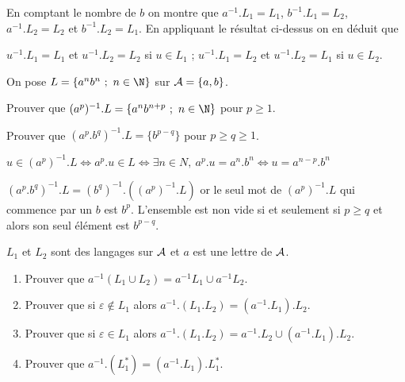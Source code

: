 \begin{Answer}
En comptant le nombre de $b$ on montre que 
$a^{-1}.L_1 = L_1$, $b^{-1}.L_1 = L_2$, $a^{-1}.L_2 = L_2$ et $b^{-1}.L_2 = L_1$.
En appliquant le résultat ci-dessus on en déduit que

$u^{-1}.L_1 = L_1$ et $u^{-1}.L_2 = L_2$ si $u\in L_1$ ; 
$u^{-1}.L_1 = L_2$ et $u^{-1}.L_2 = L_1$ si $u\in L_2$.
\end{Answer}
\begin{Exercise}[title = Un autre exemple]

On pose $L=\{a^nb^n\ ;\ n\in\N\}$ sur ${\cal A}=\{a,b\}$.

Prouver que $(a^p)^{-1}.L= \{a^nb^{n+p}\ ;\ n\in\N\}$ pour $p\ge 1$.

Prouver que $(a^p.b^q)^{-1}.L= \{b^{p-q}\}$ pour $p\ge q\ge 1$.
\end{Exercise}
\begin{Answer}

$ u\in (a^p)^{-1}.L \iff a^p.u \in L \iff \exists n\in N,\ a^p.u=a^n.b^n \iff u = a^{n-p}.b^n$

$(a^p.b^q)^{-1}.L = (b^q)^{-1}.\left((a^p)^{-1}.L\right)$ or le seul mot de $(a^p)^{-1}.L$ qui commence par un $b$ est $b^p$. L'ensemble est non vide si et seulement si $p\ge q$ et alors son seul élément est $b^{p-q}$.
\end{Answer}
\begin{Exercise}[title = Opérations rationnelles]

$L_1$ et $L_2$ sont des langages sur ${\cal A}$ et $a$ est une lettre de ${\cal A}$.

\begin{enumerate}
\item Prouver que $a^{-1}(L_1\cup L_2) = a^{-1}L_1 \cup a^{-1}L_2$.
 
\item Prouver que si $\varepsilon \notin L_1$ alors $a^{-1}.(L_1.L_2)= (a^{-1}.L_1).L_2$.

\item Prouver que si $\varepsilon \in L_1$ alors $a^{-1}.(L_1.L_2) = a^{-1}.L_2 \cup (a^{-1}.L_1).L_2$.
 		
\item Prouver que $a^{-1}.(L_1^*) = (a^{-1}.L_1).L_1^*$.
\end{enumerate}
\end{Exercise}
